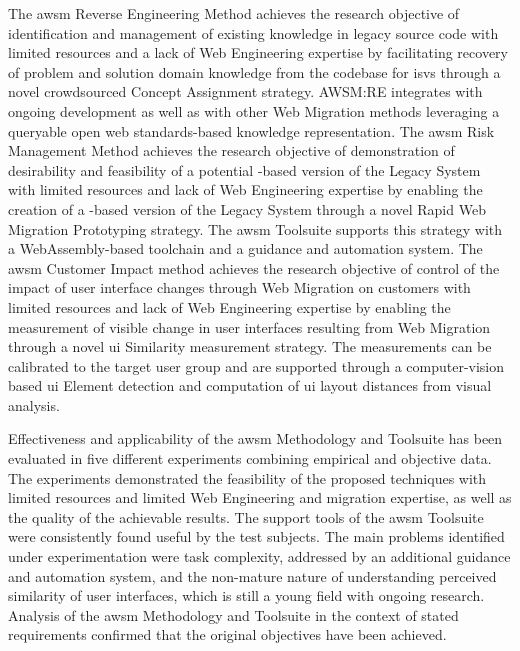 The \gls{awsm} Reverse Engineering Method achieves the research objective of identification and management of existing knowledge in legacy source code with limited resources and a lack of \gls{Web Engineering} expertise by facilitating recovery of problem and solution domain knowledge from the  codebase for \glspl{isv} through a novel crowdsourced \gls{Concept Assignment} strategy.
AWSM:RE integrates with ongoing development as well as with other \gls{Web Migration} methods leveraging a queryable open \gls{web} standards-based knowledge representation.
The \gls{awsm} Risk Management Method achieves the research objective of demonstration of desirability and feasibility of a potential -based version of the \gls{Legacy System} with limited resources and lack of \gls{Web Engineering} expertise by enabling the creation of a -based version of the \gls{Legacy System} through a novel \gls{Rapid Web Migration Prototyping} strategy.
The \gls{awsm} Toolsuite supports this strategy with a WebAssembly-based toolchain and a guidance and automation system.
The \gls{awsm} Customer Impact method achieves the research objective of control of the impact of user interface changes through \gls{Web Migration} on customers with limited resources and lack of \gls{Web Engineering} expertise by enabling the measurement of visible change in user interfaces resulting from \gls{Web Migration} through a novel \gls{ui} Similarity measurement strategy.
The measurements can be calibrated to the target user group and are supported through a computer-vision based \gls{ui} Element detection and computation of \gls{ui} layout distances from visual analysis.

Effectiveness and applicability of the \gls{awsm} Methodology and Toolsuite has been evaluated in five different experiments combining empirical and objective data.
The experiments demonstrated the feasibility of the proposed techniques with limited resources and limited \gls{Web Engineering} and migration expertise, as well as the quality of the achievable results.
The support tools of the \gls{awsm} Toolsuite were consistently found useful by the test subjects.
The main problems identified under experimentation were task complexity, addressed by an additional guidance and automation system, and the non-mature nature of understanding perceived similarity of user interfaces, which is still a young field with ongoing research.
Analysis of the \gls{awsm} Methodology and Toolsuite in the context of stated requirements confirmed that the original objectives have been achieved.

